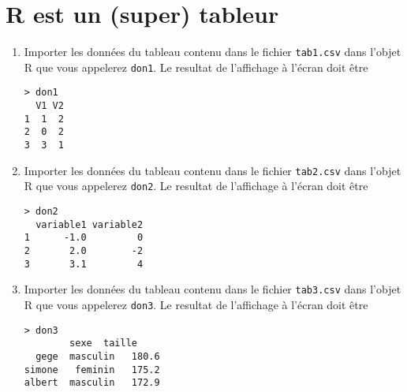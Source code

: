 \documentclass[a4paper,10pt,french]{article}
\begin{document}
\section{\textsf{R} est un (super) tableur}
\begin{enumerate}
\item Importer les données du tableau contenu dans le fichier \texttt{tab1.csv} dans l'objet \textsf{R} que vous appelerez \texttt{don1}. Le resultat de l'affichage à l'écran doit être
\begin{verbatim}
> don1
  V1 V2
1  1  2
2  0  2
3  3  1
\end{verbatim}

\item Importer les données du tableau contenu dans le fichier \texttt{tab2.csv} dans  l'objet \textsf{R} que vous appelerez  \texttt{don2}. Le resultat de l'affichage à l'écran doit être
\begin{verbatim}
> don2
  variable1 variable2
1      -1.0         0
2       2.0        -2
3       3.1         4
\end{verbatim}
\item Importer les données du tableau contenu dans le fichier \texttt{tab3.csv} dans  l'objet \textsf{R} que vous appelerez  \texttt{don3}. Le resultat de l'affichage à l'écran doit être
\begin{verbatim}
> don3
        sexe  taille
  gege  masculin   180.6
simone   feminin   175.2
albert  masculin   172.9
\end{verbatim}


\end{enumerate}
\end{document}
